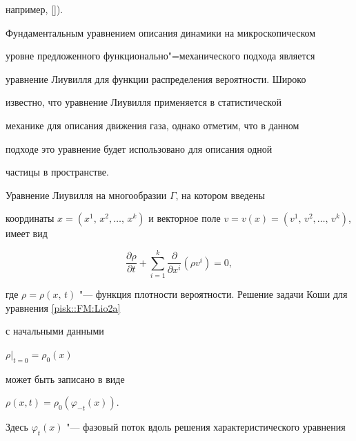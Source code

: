 например, []).



Фундаментальным уравнением описания динамики на микроскопическом

уровне предложенного функционально"=механического подхода является

уравнение Лиувилля для функции распределения вероятности. Широко

известно, что уравнение Лиувилля применяется в статистической

механике для описания движения газа, однако отметим, что в данном

подходе это уравнение будет использовано для описания одной

частицы в пространстве.



Уравнение Лиувилля на многообразии $\Gamma $, на котором введены

координаты $ x = (x^1,\, x^2, \ldots,\,x^k)$ и  векторное поле $v=v(x)=(v^1,\, v^2, \ldots,\,v^k)$, имеет вид

\begin{equation}

\label{pisk::FM:Lio2a} \frac{\partial \rho}{\partial

t}+\sum_{i=1}^k \frac{\partial}{\partial x^i}(\rho v^i)=0,

\end{equation}

где $\rho=\rho (x,\,t)$ "--- функция плотности вероятности. Решение задачи Коши для уравнения \eqref{pisk::FM:Lio2a}

с начальными данными



$\rho|_{t=0}=\rho_0(x)$


может быть записано в виде



$\rho (x,t)=\rho_0(\varphi_{-t}(x)).$


Здесь $\varphi_t(x)$ "--- фазовый поток вдоль решения характеристического уравнения

